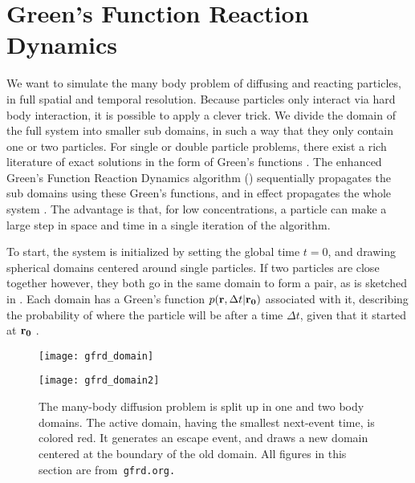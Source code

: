 \section{Green's Function Reaction Dynamics}

We want to simulate the many body problem of diffusing and reacting particles, in full spatial and temporal resolution. Because particles only interact via hard body interaction, it is possible to apply a clever trick. We divide the domain of the full system into smaller sub domains, in such a way that they only contain one or two particles. For single or double particle problems, there exist a rich literature of exact solutions in the form of Green's functions \cite{Carslaw1959}\cite{Beck1992}. The enhanced Green's Function Reaction Dynamics algorithm (\GFRD) sequentially propagates the sub domains using these Green's functions, and in effect propagates the whole system \cite{VanZon2005,VanZon2006,Takahashi2010,Bossen2011a}. The advantage is that, for low concentrations, a particle can make a large step in space and time in a single iteration of the algorithm.


To start, the system is initialized by setting the global time $t=0$, and drawing spherical domains centered around single particles. If two particles are close together however, they both go in the same domain to form a pair, as is sketched in . Each domain has a Green's function $p({\bf r}, \Delta t|{\bf r_0})$ associated with it, describing the probability of where the particle will be after a time $\Delta t$, given that it started at ${\bf r_0}$ \cite{Carslaw1959}. 

\begin{figure}[ht]
\begin{minipage}[ht]{.5\linewidth}
\centering
\texttt{[image: gfrd\_domain]}
\end{minipage}
\begin{minipage}[ht]{.5\linewidth}
\centering
\texttt{[image: gfrd\_domain2]}
\end{minipage}
\caption{ The many-body diffusion problem is split up in one and two body domains. The active domain, having the smallest next-event time, is colored red. It generates an escape event, and draws a new domain centered at the boundary of the old domain. All figures in this section are from\tt{ gfrd.org}.}
\end{figure}

